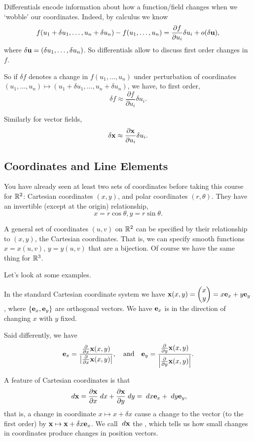 \documentclass[a4paper]{scrartcl}
\begin{document}
Differentials encode information about how a function/field changes when we `wobble' our coordinates. Indeed, by calculus we know
$$
f(u_1 + \delta u_1, \dots, u_n + \delta u_n) - f(u_1, \dots, u_n) = \frac{\partial f}{\partial u_i} \delta u_i + o(\delta \mathbf{u}),
$$
where $\delta\mathbf{u} = (\delta u_1, \dots, \delta u_n)$. So differentials allow to discuss first order changes in $f$.

So if $\delta f$ denotes a change in $f(u_1, \dots, u_n)$ under perturbation of coordinates $(u_1, \dots, u_n) \mapsto (u_1 + \delta u_1, \dots, u_n + \delta u_n)$,  we have, to first order,
$$
\delta f \approx \frac{\partial f}{\partial u_i} \delta u_i.
$$

Similarly for vector fields,
$$
\delta \mathbf{x} \approx \frac{\partial \mathbf{x}}{\partial u_i} \delta u_i.
$$

\subsection{Coordinates and Line Elements}

You have already seen at least two sets of coordinates before taking this course for $\mathbb{R}^2$: Cartesian coordinates $(x, y)$, and polar coordinates $(r, \theta)$. They have an invertible (except at the origin) relationship,
$$
x = r \cos \theta, y = r \sin \theta.
$$


A general set of coordinates $(u, v)$ on $\mathbb{R}^2$ can be specified by their relationship to $(x, y)$, the Cartesian coordinates. That is, we can specify smooth functions $x = x(u, v)$, $y = y(u, v)$ that are a bijection. Of course we have the same thing for $\mathbb{R}^3$.

Let's look at some examples.

\begin{example}
In the standard Cartesian coordinate system we have $\mathbf{x}(x, y) = \begin{pmatrix}
	x \\ y
\end{pmatrix} = x \mathbf{e}_x + y \mathbf{e}_y$, where $\{\mathbf{e}_x, \mathbf{e}_y\}$ are orthogonal vectors. We have $\mathbf{e}_x$ is in the direction of changing $x$ with $y$ fixed.

Said differently, we have 
$$\mathbf{e}_x = \frac{\frac{\partial}{\partial x} \mathbf{x}(x, y)}{\left|\frac{\partial}{\partial x} \mathbf{x}(x, y)\right|}, \quad \text{and} \quad \mathbf{e}_y = \frac{\frac{\partial}{\partial y} \mathbf{x}(x, y)}{\left|\frac{\partial}{\partial y} \mathbf{x}(x, y)\right|}.$$

A feature of Cartesian coordinates is that
$$
\; d \mathbf{x} = \frac{\partial \mathbf{x}}{\partial x} \; d x + \frac{\partial \mathbf{x}}{\partial y} \; d y = \; d x \mathbf{e}_x + \; d y \mathbf{e}_y,
$$
that is, a change in coordinate $x \mapsto x + \delta x$ cause a change to the vector (to the first order) by $\mathbf{x} \mapsto \mathbf{x} + \delta x \mathbf{e}_x$. We call $\; d \mathbf{x}$ the , which tells us how small changes in coordinates produce changes in position vectors.
\end{example}
\end{document}
